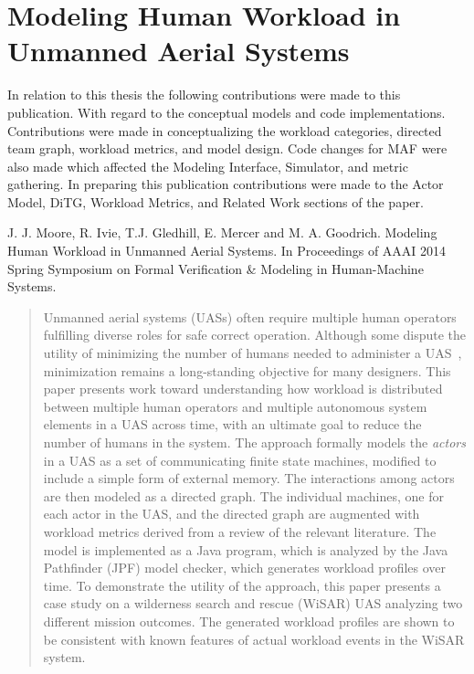 \chapter{Modeling Human Workload in Unmanned Aerial Systems}\label{ch:workload_paper}

In relation to this thesis the following contributions were made to this publication.  With regard to the conceptual models and code implementations.  Contributions were made in conceptualizing the workload categories, directed team graph, workload metrics, and model design.  Code changes for MAF were also made which affected the Modeling Interface, Simulator, and metric gathering.  In preparing this publication contributions were made to the Actor Model, DiTG, Workload Metrics, and Related Work sections of the paper.
\linebreak

\noindent J. J. Moore, R. Ivie, T.J. Gledhill, E. Mercer and M. A. Goodrich. Modeling Human Workload in Unmanned Aerial Systems. In Proceedings of AAAI 2014 Spring Symposium on Formal Verification \& Modeling in Human-Machine Systems.

\begin{abstract}
Unmanned aerial systems (UASs) often require multiple human operators fulfilling diverse roles for safe correct operation.  Although some dispute the utility of minimizing the number of humans needed to administer a UAS~\cite{MurphyBurke2010}, minimization remains a long-standing objective for many designers.  This paper presents work toward understanding how workload is distributed between multiple human operators and multiple autonomous system elements in a UAS across time, with an ultimate goal to reduce the number of humans in the system. The approach formally models the {\em actors} in a UAS as a set of communicating finite state machines, modified to include a simple form of external memory. The interactions among actors are then modeled as a directed graph.  The individual machines, one for each actor in the UAS, and the directed graph are augmented with workload metrics derived from a review of the relevant literature. The model is implemented as a Java program, which is analyzed by the Java Pathfinder (JPF) model checker, which generates workload profiles over time.  To demonstrate the utility of the approach, this paper presents a case study on a wilderness search and rescue (WiSAR) UAS analyzing two different mission outcomes. The generated workload profiles are shown to be consistent with known features of actual workload events in the WiSAR system. 
\end{abstract}

